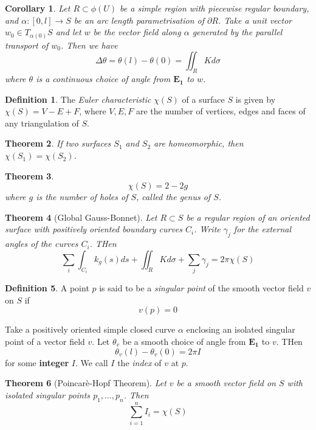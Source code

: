 \documentclass[10pt, oneside, reqno]{amsart}
\theoremstyle{plain}%
\newtheorem{thm}{Theorem}[section]
\newtheorem*{cor}{Corollary}
\theoremstyle{definition}
\newtheorem{defn}[thm]{Definition}
\theoremstyle{remark}
\begin{document}
\begin{cor}
    Let $R \subset \phi(U)$ be a simple region with piecewise regular boundary, and $\alpha: [0,l] \rightarrow S$ be an arc length parametrisation of $\partial R$.   
    Take a unit vector $w_0 \in T_{\alpha(0)}S$ and let $w$ be the vector field along $\alpha$ generated by the parallel transport of $w_0$.  Then we have 
    \[ \Delta \theta = \theta(l) - \theta(0) = \iint_R K d \sigma \]
    where $\theta$ is a continuous choice of angle from $\mathbf{E_1}$ to $w$.
\end{cor}


\begin{defn}
    The \emph{Euler characteristic} $ \chi(S)$ of a surface $S$ is given by $\chi(S) = V - E + F$, where $V,E,F$ are the number of vertices, edges and faces of any triangulation of $S$.
\end{defn}

\begin{thm}
    If two surfaces $S_1$ and $S_2$ are homeomorphic, then $\chi(S_1) = \chi(S_2)$.
\end{thm}

\begin{thm}
    \[\chi(S) = 2 - 2g \]
    where $g$ is the number of holes of $S$, called the \emph{genus} of $S$.
\end{thm}

\begin{thm}[Global Gauss-Bonnet]
    Let $R \subset S$ be a regular region of an oriented surface with positively oriented boundary curves $C_i$. Write $\gamma_j$ for the external angles of the curves $C_i$.  THen \[
        \sum_{i} \int_{C_i} k_g(s) ds + \iint_R K d \sigma + \sum_j \gamma_j = 2 \pi \chi(S)
    \]
\end{thm}


\begin{defn}
    A point $p$ is said to be a \emph{singular point} of the smooth vector field $v$ on $S$ if \[
        v(p) = 0
    \]
    
    Take a positively oriented simple closed curve $\alpha$ enclosing an isolated singular point of a vector field $v$.  Let $\theta_v$ be a smooth choice of angle from $\mathbf{E_1}$ to $v$.  THen \[
        \theta_v(l) - \theta_v(0) = 2 \pi I
    \]
    for some \textbf{integer} $I$.  We call $I$ the \emph{index} of $v$ at $p$.
\end{defn}

\begin{thm}[Poincar\`{e}-Hopf Theorem]
    Let $v$ be a smooth vector field on $S$ with isolated singular points $p_1,\dots, p_n$.  Then \[
        \sum_{i=1}^n I_i = \chi(S)
    \]
\end{thm}
\end{document}
